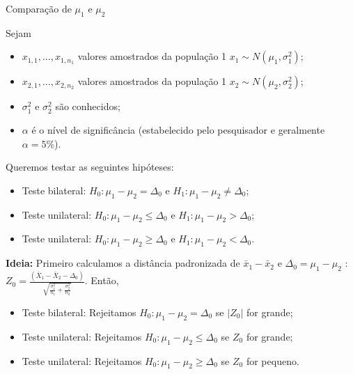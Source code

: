 \documentclass[9pt]{beamer}
\begin{document}
\begin{frame}{Comparação de $\mu_1$ e $\mu_2$}

Sejam
\begin{itemize}
	\item $x_{1,1}, \dots, x_{1, n_1}$ valores amostrados da população 1 $x_1 \sim N(\mu_1, \sigma_1^2)$;
	\item $x_{2,1}, \dots, x_{2, n_2}$ valores amostrados da população 1 $x_2 \sim N(\mu_2, \sigma_2^2)$;
	\item $\sigma_1^2$ e $\sigma_2^2$ são conhecidos;
	\item $\alpha$ é o nível de significância (estabelecido pelo pesquisador e geralmente $\alpha=5\%$). 
\end{itemize}
\vfill

Queremos testar as seguintes hipóteses:
\begin{itemize}
	\item Teste bilateral: $H_0: \mu_1 - \mu_2 = \Delta_0$ e $H_1: \mu_1 - \mu_2 \neq \Delta_0$;
	\item Teste unilateral: $H_0: \mu_1 - \mu_2 \leq \Delta_0$ e $H_1: \mu_1 - \mu_2 > \Delta_0$;
	\item Teste unilateral: $H_0: \mu_1 - \mu_2 \geq \Delta_0$ e $H_1: \mu_1 - \mu_2 < \Delta_0$.
\end{itemize}
\vfill

\textbf{Ideia:} Primeiro calculamos a distância padronizada de $\bar{x}_1 - \bar{x}_2$ e $\Delta_0=\mu_1 - \mu_2$ : $Z_0 = \frac{(\bar{X}_1 - \bar{X}_2 - \Delta_0)}{\sqrt{ \frac{\sigma_1^2}{n_1} + \frac{\sigma_2^2}{n_2} }}$. Então, 
\begin{itemize}
	\item Teste bilateral: Rejeitamos $H_0: \mu_1 - \mu_2 =\Delta_0$ se $\lvert Z_0 \rvert$ for grande;
	\item Teste unilateral: Rejeitamos $H_0: \mu_1 - \mu_2 \leq \Delta_0$ se $Z_0 $ for grande;
	\item Teste unilateral: Rejeitamos $H_0: \mu_1 - \mu_2 \geq \Delta_0$ se $Z_0 $ for pequeno.
\end{itemize}

\end{frame}
\end{document}
